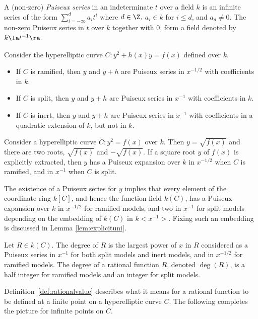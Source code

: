 \bd\label{def:Puiseux} \cite[Adapted from Section 2]{jacobson_fast_2007} A
(non-zero) \emph{Puiseux series} in an indeterminate $t$ over a field $k$ is an
infinite series of the form $\sum_{i = -\infty}^d a_it^i$ where $d \in \Z,$
$a_i \in k$ for $i \leq d$, and $a_d \neq 0$. The
non-zero Puiseux series in $t$ over $k$ together with 0, form a field denoted by
$k \la t^{-1} \ra $.
\ed

\br\label{rem:Puiseux}
\cite[Adapted from Section 2]{jacobson_fast_2007} Consider the hyperelliptic curve $C :
y^2 + h(x)y = f(x)$ defined over $k$.
\begin{itemize}
    \item If $C$ is ramified, then $y$ and $y+h$ are Puiseux series in
    $x^{-1/2}$ with coefficients in $k$. 
    \item If $C$ is split, then $y$ and $y+h$ are Puiseux series in $x^{-1}$
    with coefficients in $k$.
    \item If $C$ is inert, then $y$ and $y+h$ are Puiseux series in $x^{-1}$
    with coefficients in a quadratic extension of $k$, but not in $k$.
\end{itemize} 
\er

\be
Consider a hyperelliptic curve $C : y^2 = f(x)$ over $k$. Then $y = \sqrt{f(x)}$
and there are two roots, $\sqrt{f(x)}$ and $-\sqrt{f(x)}$. If a square root $y$
of $f(x)$ is explicitly extracted, then $y$ has a Puiseux expansion over $k$ in
$x^{-1/2}$ when $C$ is ramified, and in $x^{-1}$ when $C$ is split.
\ee

The existence of a Puiseux series for $y$ implies that every element of the
coordinate ring $k[C]$, and hence the function field $k(C)$, has a Puiseux
expansion over $k$ in $x^{-1/2}$ for ramified models, and two in $x^{-1}$ for
split models depending on the embedding of $k(C)$ in $k<x^{-1}>$. Fixing such an
embedding is discussed in Lemma \ref{lem:explicituni}.

\bd\label{def:degR}
\cite[Adapted from Section 3]{jacobson_fast_2007} Let $R \in k(C)$. The degree of $R$ is
the largest power of $x$ in $R$ considered as a Puiseux series in $x^{-1}$ for
both split models and inert models, and in $x^{-1/2}$ for ramified models. The degree of a
rational function $R$, denoted $\deg(R)$, is a half integer for ramified models
and an integer for split models.
\ed

Definition~\ref{def:rationalvalue} describes what it means for a rational
function to be defined at a finite point on a hyperelliptic curve $C$. The
following completes the picture for infinite points on $C$.

